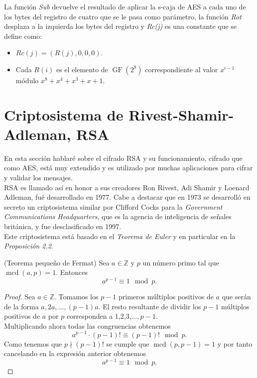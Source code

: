 La función \emph{Sub} devuelve el resultado de aplicar la s-caja de AES a cada uno de los bytes del registro de cuatro que se le pasa como parámetro, la función \emph{Rot} desplaza a la izquierda los bytes del registro y \emph{Rc(j)} es una constante que se define como:
\begin{itemize}
	\item $Rc(j)=(R(j),0,0,0)$.
	\item Cada $R(i)$ es el elemento de $\operatorname{GF}(2^8)$ correspondiente al valor $x^{i-1}$ módulo $x^8+x^4+x^3+x+1$.
\end{itemize}

\section{Criptosistema de Rivest-Shamir-Adleman, RSA}
En esta sección hablaré sobre el cifrado RSA y su funcionamiento, cifrado que como AES, está muy extendido y es utilizado por muchas aplicaciones para cifrar y validar los mensajes.\\
RSA es llamado así en honor a sus creadores Ron Rivest, Adi Shamir y Loenard Adleman, fué desarrollado en 1977. Cabe a destacar que en 1973 se desarrolló en secreto un criptosistema similar por Clifford Cocks para la \emph{Government Communications Headquarters}, que es la agencia de inteligencia de señales británica, y fue desclasificado en 1997\cite{cliffordCocks}.\\
Este criptosistema está basado en el \emph{Teorema de Euler} y en particular en la \emph{Proposición 2.2}.\\

\begin{teorema}
		(Teorema pequeño de Fermat) Sea $a \in \mathbb{Z}$ y $p$ un número primo tal que $\operatorname{mcd}(a,p)=1$. Entonces
	$$
		a^{p-1} \equiv 1 \mod p.
	$$
\end{teorema}\vspace*{-10mm}
\begin{proof}
		Sea $a \in \mathbb{Z}$. Tomamos los $p-1$ primeros múltiplos positivos de $a$ que serán de la forma $a, 2a,\dots,(p-1)a$. El resto resultante de dividir los $p-1$ múltiplos positivos de $a$ por $p$ corresponden a 1,2,3,$\dots,p-1$.\\
	Multiplicando ahora todas las congruencias obtenemos 
	$$
		a^{p-1}·(p-1)! \equiv (p-1)! \mod p.
	$$
	Como tenemos que $p\nmid (p-1)!$ se cumple que $\operatorname{mcd}(p,p-1)=1$ y por tanto cancelando en la expresión anterior obtenemos
	$$
		a^{p-1} \equiv 1 \mod p.
	$$
\end{proof}

